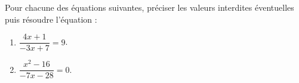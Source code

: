 \documentclass[a4paper,11pt,exos]{nsi} %
\begin{document}
\maketitle




\begin{exercice}
    Pour chacune des équations suivantes, préciser les valeurs interdites éventuelles puis résoudre l'équation :
    \begin{multicols}{3}
        \begin{enumerate}
            \item $\dfrac{4x+1}{-3x+7}=9$.
	        \item $\dfrac{x^2-16}{-7x-28}=0$.
        \end{enumerate}
    \end{multicols}
    
\end{exercice}
\end{document}

